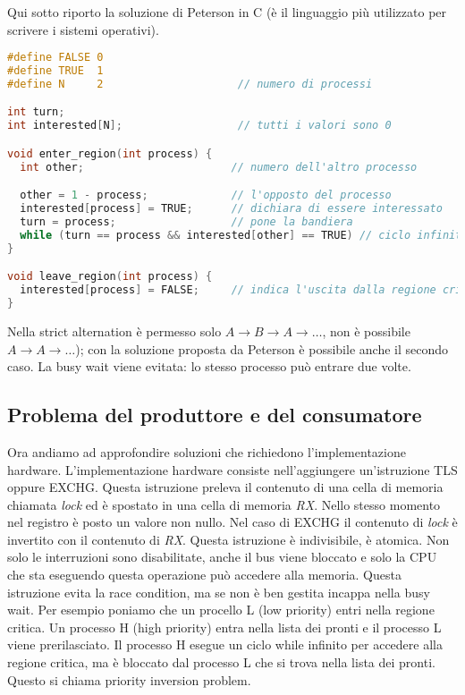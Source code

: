 \documentclass{article}
\begin{document}
Qui sotto riporto la soluzione di Peterson in C (è il linguaggio più utilizzato per scrivere i sistemi operativi).

\begin{lstlisting}[language=C]
#define FALSE 0
#define TRUE  1
#define N     2                     // numero di processi

int turn;
int interested[N];                  // tutti i valori sono 0

void enter_region(int process) {
  int other;                       // numero dell'altro processo

  other = 1 - process;             // l'opposto del processo
  interested[process] = TRUE;      // dichiara di essere interessato
  turn = process;                  // pone la bandiera
  while (turn == process && interested[other] == TRUE) // ciclo infinito
}

void leave_region(int process) {
  interested[process] = FALSE;     // indica l'uscita dalla regione critica
}
\end{lstlisting}

Nella strict alternation è permesso solo $A \rightarrow B \rightarrow A \rightarrow \dots$, non è possibile $A \rightarrow A \rightarrow \dots$); con la soluzione proposta da Peterson è possibile anche il secondo caso. La busy wait viene evitata: lo stesso processo può entrare due volte.\\

\subsection{Problema del produttore e del consumatore}
Ora andiamo ad approfondire soluzioni che richiedono l'implementazione hardware. L'implementazione hardware consiste nell'aggiungere un'istruzione TLS oppure EXCHG. Questa istruzione preleva il contenuto di una cella di memoria chiamata \textit{lock} ed è spostato in una cella di memoria \textit{RX}. Nello stesso momento nel registro è posto un valore non nullo. Nel caso di EXCHG il contenuto di \textit{lock} è invertito con il contenuto di \textit{RX}. Questa istruzione è indivisibile, è atomica. Non solo le interruzioni sono disabilitate, anche il bus viene bloccato e solo la CPU che sta eseguendo questa operazione può accedere alla memoria. Questa istruzione evita la race condition, ma se non è ben gestita incappa nella busy wait. Per esempio poniamo che un procello L (low priority) entri nella regione critica. Un processo H (high priority) entra nella lista dei pronti e il processo L viene prerilasciato. Il processo H esegue un ciclo while infinito per accedere alla regione critica, ma è bloccato dal processo L che si trova nella lista dei pronti. Questo si chiama priority inversion problem.\\
\end{document}

